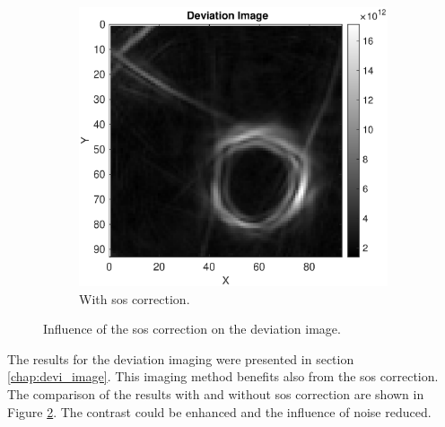 \begin{figure}[H]
\begin{subfigure}[b]{0.47\textwidth}
         \includegraphics[width=1.09\linewidth]{Graphics/Results/14_vecs_sos_vs_noSos/Deviation_14vecs_with_sos_z_direction.eps}
         \caption{With \ac{sos} correction. }
         \label{leer}
     \end{subfigure}
        \caption{Influence of the \ac{sos} correction on the deviation image.}
        \label{fig:influence_sos_on_deviation}
\end{figure}


The results for the deviation imaging were presented in section \ref{chap:devi_image}. This imaging method benefits also from the \ac{sos} correction. The comparison of the results with and without \ac{sos} correction are shown in Figure \ref{fig:influence_sos_on_deviation}. The contrast could be enhanced and the influence of noise reduced. 

